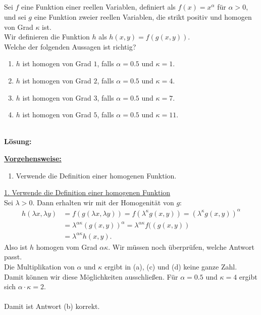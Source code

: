 \subsection*{}
Sei $ f $ eine Funktion einer reellen Variablen, definiert als $ f(x) = x^\alpha $ für $ \alpha > 0 $, und sei $ g $ eine Funktion zweier reellen Variablen, die strikt positiv und homogen von Grad $ \kappa $ ist.\\
Wir definieren die Funktion $ h $ als $ h(x,y)  = f(g(x,y))$.\\
Welche der folgenden Aussagen ist richtig?
\renewcommand{\labelenumi}{(\alph{enumi})}
\begin{enumerate}
	\item 
	$ h $ ist homogen von Grad $ 1 $, falls $ \alpha =0.5 $ und $ \kappa = 1 $.
	\item
	$ h $ ist homogen von Grad $ 2 $, falls $ \alpha =0.5 $ und $ \kappa = 4 $.
	\item
	$ h $ ist homogen von Grad $ 3 $, falls $ \alpha =0.5 $ und $ \kappa = 7 $.
	\item
	$ h $ ist homogen von Grad $ 5 $, falls $ \alpha =0.5 $ und $ \kappa = 11 $.
\end{enumerate}
\ \\
\textbf{Lösung:}
\begin{mdframed}
\underline{\textbf{Vorgehensweise:}}
\renewcommand{\labelenumi}{\theenumi.}
\begin{enumerate}
\item Verwende die Definition einer homogenen Funktion.
\end{enumerate}
\end{mdframed}

\underline{1. Verwende die Definition einer homogenen Funktion}\\
Sei $ \lambda > 0 $.
Dann erhalten wir mit der Homogenität von $ g $:
\begin{align*}
	h(\lambda x, \lambda y)
	&=
	f ( g(\lambda x, \lambda y))
	=
	f ( \lambda^\kappa g(x,y))
	=
	( \lambda^\kappa g(x,y))^\alpha\\
	&=
	\lambda^{\alpha \kappa} (g(x,y))^\alpha
	=
	\lambda^{\alpha \kappa} f((g(x,y))\\
	&=
	\lambda^{\alpha \kappa} h(x,y).
\end{align*}
Also ist $ h $ homogen vom Grad $ \alpha \kappa $.
Wir müssen noch überprüfen, welche Antwort passt.\\
Die Multiplikation von $ \alpha $ und $  \kappa $ ergibt in (a), (c) und (d) keine ganze Zahl. Damit können wir diese Möglichkeiten ausschließen.
Für $ \alpha = 0.5 $ und $ \kappa = 4 $ ergibt sich $ \alpha \cdot \kappa = 2 $.\\
\\
Damit ist Antwort (b) korrekt.


